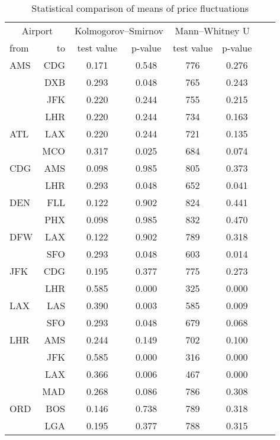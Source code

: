 \begin{table}[h]
    \begin{center}
        \begin{tabular}{l r c c c c c c}
            \toprule
            \multicolumn{2}{c}{Airport}  &  \multicolumn{2}{c}{Kolmogorov--Smirnov} & \multicolumn{2}{c}{Mann--Whitney U} \\[.4ex]
            from  &  to  &  test value   &  p-value  & test value  &  p-value  \\
\midrule
AMS  &  CDG  &  0.171  &  0.548  &  776  &  0.276  \\
~    &  DXB  &  0.293  &  0.048  &  765  &  0.243  \\
~    &  JFK  &  0.220  &  0.244  &  755  &  0.215  \\
~    &  LHR  &  0.220  &  0.244  &  734  &  0.163  \\[.5ex]
ATL  &  LAX  &  0.220  &  0.244  &  721  &  0.135  \\
~    &  MCO  &  0.317  &  0.025  &  684  &  0.074  \\[.5ex]
CDG  &  AMS  &  0.098  &  0.985  &  805  &  0.373  \\
~    &  LHR  &  0.293  &  0.048  &  652  &  0.041  \\[.5ex]
DEN  &  FLL  &  0.122  &  0.902  &  824  &  0.441  \\
~    &  PHX  &  0.098  &  0.985  &  832  &  0.470  \\[.5ex]
DFW  &  LAX  &  0.122  &  0.902  &  789  &  0.318  \\
~    &  SFO  &  0.293  &  0.048  &  603  &  0.014  \\[.5ex]
JFK  &  CDG  &  0.195  &  0.377  &  775  &  0.273  \\
~    &  LHR  &  0.585  &  0.000  &  325  &  0.000  \\[.5ex]
LAX  &  LAS  &  0.390  &  0.003  &  585  &  0.009  \\
~    &  SFO  &  0.293  &  0.048  &  679  &  0.068  \\[.5ex]
LHR  &  AMS  &  0.244  &  0.149  &  702  &  0.100  \\
~    &  JFK  &  0.585  &  0.000  &  316  &  0.000  \\
~    &  LAX  &  0.366  &  0.006  &  467  &  0.000  \\
~    &  MAD  &  0.268  &  0.086  &  786  &  0.308  \\[.5ex]
ORD  &  BOS  &  0.146  &  0.738  &  789  &  0.318  \\
~    &  LGA  &  0.195  &  0.377  &  788  &  0.315  \\
            \bottomrule
        \end{tabular}
        \caption{Statistical comparison of means of price fluctuations}
        \label{tbl:StatisicalComparison}
    \end{center}
\end{table}



